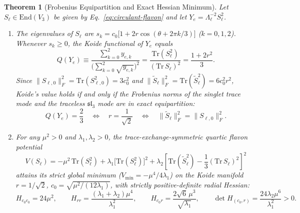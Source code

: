 \documentclass[11pt,a4paper]{article}
\newtheorem{theorem}{Theorem}[section]
\begin{document}
\begin{theorem}[Frobenius Equipartition and Exact Hessian Minimum]
\label{thm:koide-equipartition}
Let $S_\ell \in \mathrm{End}(V_3)$ be given by Eq.~\eqref{eq:circulant-flavon} and let $Y_e = \Lambda_\ell^{-2} S_\ell^2$.
\begin{enumerate}[label=(\roman*),leftmargin=1.8em,itemsep=2pt]
\item The eigenvalues of $S_\ell$ are $s_k = c_0\big[1 + 2r\cos(\theta + 2\pi k/3)\big]$ ($k = 0,1,2$). Whenever $s_k \ge 0$, the Koide functional of $Y_e$ equals
\begin{equation}
Q(Y_e) \equiv \frac{\sum_{k=0}^{2} y_{e,k}}{\big(\sum_{k=0}^{2}\sqrt{y_{e,k}}\big)^2}
= \frac{\mathrm{Tr}(S_\ell^2)}{(\mathrm{Tr}\,S_\ell)^2} = \frac{1 + 2r^2}{3}.
\label{eq:koide-identity}
\end{equation}
Since $\|S_{\ell,0}\|_F^2 = \mathrm{Tr}(S_{\ell,0}^2) = 3c_0^2$ and $\|\tilde{S}_\ell\|_F^2 = \mathrm{Tr}(\tilde{S}_\ell^2) = 6c_0^2 r^2$, Koide's value holds if and only if the Frobenius norms of the singlet trace mode and the traceless $\mathfrak{sl}_3$ mode are in exact equipartition:
\begin{equation}
Q(Y_e) = \frac{2}{3} \quad\Longleftrightarrow\quad r = \frac{1}{\sqrt{2}} \quad\Longleftrightarrow\quad \|\tilde{S}_\ell\|_F^2 = \|S_{\ell,0}\|_F^2.
\label{eq:frobenius-equipartition}
\end{equation}
\item For any $\mu^2 > 0$ and $\lambda_1, \lambda_2 > 0$, the trace-exchange-symmetric quartic flavon potential
\begin{equation}
V(S_\ell) = -\mu^2\,\mathrm{Tr}(S_\ell^2) + \lambda_1\big[\mathrm{Tr}(S_\ell^2)\big]^2 + \lambda_2\left[\mathrm{Tr}(\tilde{S}_\ell^2) - \frac{1}{3}(\mathrm{Tr}\,S_\ell)^2\right]^2
\label{eq:flavon-potential}
\end{equation}
attains its strict global minimum ($V_{\min} = -\mu^4 / 4\lambda_1$) on the Koide manifold $r = 1/\sqrt{2}$, $c_0 = \sqrt{\mu^2 / (12\lambda_1)}$, with strictly positive-definite radial Hessian:
\begin{equation}
H_{c_0 c_0} = 24\mu^2, \qquad
H_{rr} = \frac{(\lambda_1 + \lambda_2)\mu^4}{\lambda_1^2}, \qquad
H_{c_0 r} = \frac{2\sqrt{6}\,\mu^3}{\sqrt{\lambda_1}}, \qquad
\det H_{(c_0, r)} = \frac{24\lambda_2 \mu^6}{\lambda_1^2} > 0.
\label{eq:hessian-exact}
\end{equation}
\end{enumerate}
\end{theorem}
\end{document}

